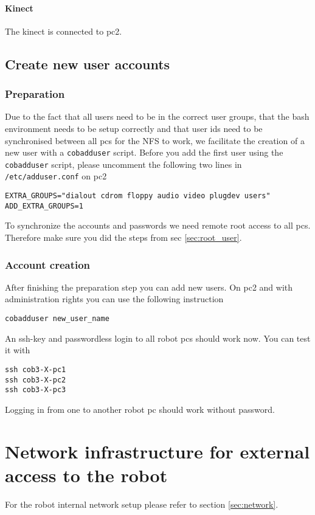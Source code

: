\paragraph{Kinect}
The kinect is connected to pc2.


\subsection{Create new user accounts}
\subsubsection{Preparation}
\label{sec:account}
Due to the fact that all users need to be in the correct user groups, that the bash environment needs to be setup correctly and that user ids need to be synchronised between all pcs for the NFS to work, we facilitate the creation of a new user with a \texttt{cobadduser} script. Before you add the first user using the \texttt{cobadduser} script, please uncomment the following two lines in \texttt{/etc/adduser.conf} on pc2
\begin{lstlisting}
EXTRA_GROUPS="dialout cdrom floppy audio video plugdev users"
ADD_EXTRA_GROUPS=1
\end{lstlisting}

To synchronize the accounts and passwords we need remote root access to all pcs. Therefore make sure you did the steps from sec \ref{sec:root_user}.

\subsubsection{Account creation}
After finishing the preparation step you can add new users. On pc2 and with administration rights you can use the following instruction
\begin{lstlisting}
cobadduser new_user_name
\end{lstlisting}

An ssh-key and passwordless login to all robot pcs should work now. You can test it with
\begin{lstlisting}
ssh cob3-X-pc1
ssh cob3-X-pc2
ssh cob3-X-pc3
\end{lstlisting}
Logging in from one to another robot pc should work without password.

\section{Network infrastructure for external access to the robot}
For the robot internal network setup please refer to section \ref{sec:network}.

